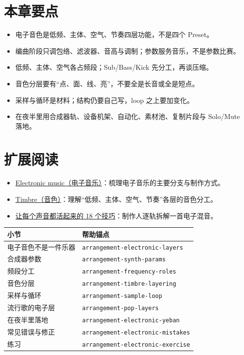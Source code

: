 \section{本章要点}
\label{sec:electronic-takeaways}

\begin{itemize}
\item 电子音色是低频、主体、空气、节奏四层功能，不是四个 Preset。
\item 编曲阶段只调包络、滤波器、音高与调制；参数服务音乐，不是参数比赛。
\item 低频、主体、空气各占频段；Sub/Bass/Kick 先分工，再谈压缩。
\item 音色分层要有“点、面、线、亮”，不要全是长音或全是短点。
\item 采样与循环是材料；结构仍要自己写，loop 之上要加变化。
\item 在夜半里用合成器轨、设备机架、自动化、素材池、复制片段与 Solo/Mute 落地。
\end{itemize}

\section{扩展阅读}
\label{sec:08-electronic-further-reading}
\begin{itemize}
  \item \href{https://en.wikipedia.org/wiki/Electronic_music}{Electronic music（电子音乐）}：梳理电子音乐的主要分支与制作方式。
  \item \href{https://en.wikipedia.org/wiki/Timbre}{Timbre（音色）}：理解“低频、主体、空气、节奏”各层的音色分工。
  \item \href{https://www.youtube.com/watch?v=KS89XfqFE9A}{让每个声音都活起来的 18 个技巧}：制作人逐轨拆解一首电子混音。
\end{itemize}

\begin{helpmapping}
\begin{longtable}{p{}p{}}
\toprule
小节 & 帮助锚点 \\
\midrule
电子音色不是一件乐器 & \texttt{arrangement-electronic-layers} \\
合成器参数 & \texttt{arrangement-synth-params} \\
频段分工 & \texttt{arrangement-frequency-roles} \\
音色分层 & \texttt{arrangement-timbre-layering} \\
采样与循环 & \texttt{arrangement-sample-loop} \\
流行歌的电子层 & \texttt{arrangement-pop-layers} \\
在夜半里落地 & \texttt{arrangement-electronic-yeban} \\
常见错误与修正 & \texttt{arrangement-electronic-mistakes} \\
练习 & \texttt{arrangement-electronic-exercise} \\
\bottomrule
\end{longtable}
\end{helpmapping}
